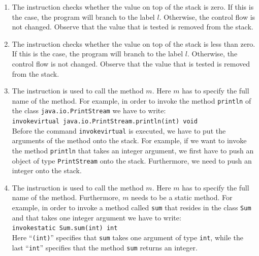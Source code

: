 \begin{enumerate}
      There are similar commands called \texttt{if\_icmpgt} and \texttt{if\_icmpge}.

\item The instruction 
      checks whether the value on top of the stack is zero.  If this is the case, the program will branch
      to the label $l$.  Otherwise, the control flow is not changed.  Observe that the value that is
      tested is removed from the stack.

\item The instruction 
      checks whether the value on top of the stack is less than zero.  If this is the case, the program
      will branch to the label $l$.  Otherwise, the control flow is not changed.  Observe that the value
      that is tested is removed from the stack.

\item The instruction 
      is used to call the method $m$.  Here $m$ has to  specify the full name of the method.
      For example, in order to invoke the method \texttt{println} of the class
      \texttt{java.io.PrintStream} we have to write:
      \\[0.2cm]
      \hspace*{1.3cm}
      \texttt{invokevirtual java.io.PrintStream.println(int) void}
      \\[0.2cm]
      Before the command \texttt{invokevirtual} is executed, we have to put the arguments of the method
      onto the stack.  For example, if we want to invoke the method \texttt{println} that takes an integer
      argument, we first have to push an object of type \texttt{PrintStream} onto the stack.  Furthermore,
      we need to push an integer onto the stack.

\item The instruction 
      is used to call the method $m$.  Here $m$ has to  specify the full name of the method.
      Furthermore, $m$ needs to be a static method.
      For example, in order to invoke a  method called \texttt{sum} that resides in the class \texttt{Sum}
      and that takes one integer argument we have to write:
      \\[0.2cm]
      \hspace*{1.3cm}
      \texttt{invokestatic  Sum.sum(int) int}
      \\[0.2cm]
      Here ``\texttt{(int)}'' specifies that \texttt{sum} takes one argument of type \texttt{int}, while the
      last ``\texttt{int}'' specifies that the method \texttt{sum} returns an integer.


\end{enumerate}
